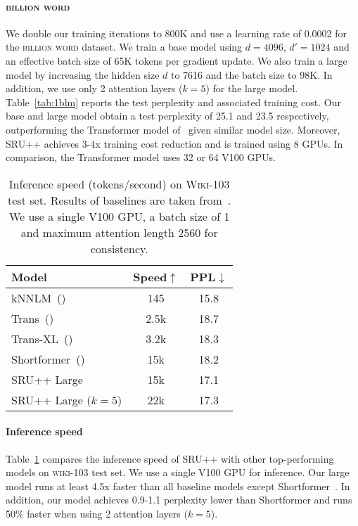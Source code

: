 \paragraph{\textsc{billion word}}
We double our training iterations to 800K and use a learning rate of 0.0002 for the \textsc{billion word} dataset. 
We train a base model using $d=4096$, $d'=1024$ and an effective batch size of 65K tokens per gradient update.
We also train a large model by increasing the hidden size $d$ to 7616 and the batch size to 98K.
In addition, we use only 2 attention layers ($k=5$) for the large model.
Table~\ref{tab:1blm} reports the test perplexity and associated training cost.
Our base and large model obtain a test perplexity of 25.1 and 23.5 respectively, outperforming the Transformer model of~\citet{baevski2018adaptive} given similar model size.
Moreover, SRU++ achieves 3-4x training cost reduction and is trained using 8 GPUs.
In comparison, the Transformer model uses 32 or 64 V100 GPUs.

\begin{table}[!t]
    \centering
    \begin{tabular}{lcc}
    \toprule
    \bf Model & \bf Speed$\uparrow$ & \bf PPL$\downarrow$\\
    \hline
    kNNLM~(\citeauthor{Khandelwal2020Generalization}) & 145 & 15.8\\
    Trans~(\citeauthor{baevski2018adaptive}) & 2.5k & 18.7\\
    Trans-XL~(\citeauthor{dai-etal-2019-transformer}) & 3.2k & 18.3 \\
    Shortformer~(\citeauthor{press2020shortformer}) & 15k & 18.2\\
    \hline
    SRU++ Large & 15k & 17.1\\
    SRU++ Large ($k=5$) & 22k & 17.3\\
    \bottomrule
    \end{tabular}
    \caption{Inference speed (tokens/second) on \textsc{Wiki-103} test set. Results of baselines are taken from~\citet{press2020shortformer}. We use a single V100 GPU, a batch size of 1 and maximum attention length 2560 for consistency.}
    \label{tab:inference_speed}
\end{table}

\paragraph{Inference speed}
Table~\ref{tab:inference_speed} compares the inference speed of SRU++ with other top-performing models on \textsc{wiki-103} test set.
We use a single V100 GPU for inference.
Our large model runs at least 4.5x faster than all baseline models except Shortformer~\cite{press2020shortformer}.
In addition, our model achieves 0.9-1.1 perplexity lower than Shortformer and runs 50\% faster when using 2 attention layers ($k=5$).


